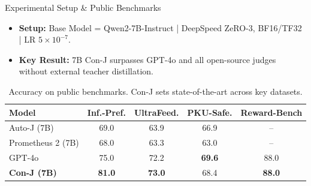 \documentclass[10pt]{beamer}
\begin{document}
\begin{frame}{Experimental Setup \& Public Benchmarks}
\begin{itemize}
    \item \textbf{Setup:} Base Model = Qwen2-7B-Instruct | DeepSpeed ZeRO-3, BF16/TF32 | LR $5 \times 10^{-7}$.
    \item \textbf{Key Result:} 7B Con-J surpasses GPT-4o and all open-source judges without external teacher distillation.
\end{itemize}

\vspace{0.2cm}
\begin{table}
    \centering
    \small
    \begin{tabular}{lcccc}
        \toprule
        \textbf{Model} & \textbf{Inf.-Pref.} & \textbf{UltraFeed.} & \textbf{PKU-Safe.} & \textbf{Reward-Bench} \\
        \midrule
        Auto-J (7B) & 69.0 & 63.9 & 66.9 & -- \\
        Prometheus 2 (7B) & 68.0 & 63.3 & 63.0 & -- \\
        GPT-4o & 75.0 & 72.2 & \textbf{69.6} & 88.0 \\
        \textbf{Con-J (7B)} & \textbf{81.0} & \textbf{73.0} & 68.4 & \textbf{88.0} \\
        \bottomrule
    \end{tabular}
    \caption{Accuracy on public benchmarks. Con-J sets state-of-the-art across key datasets.}
    \label{tab:conj_public}
\end{table}
\end{frame}
\end{document}
